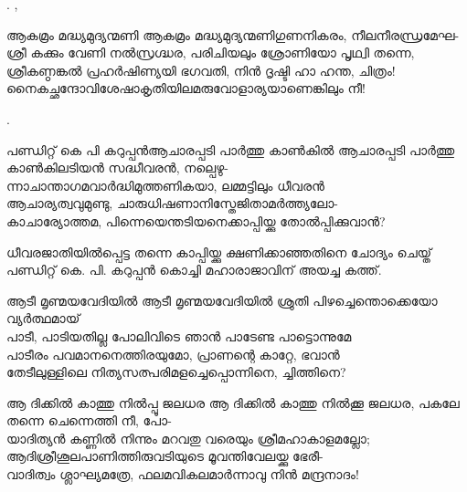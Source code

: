 \begin{enumerate}

.  ,


\begin{slokam}{\VSr}{\VNM}{ആകമ്രം മദ്ധ്യമുദ്യന്മണി}
ആകമ്രം മദ്ധ്യമുദ്യന്മണിഗുണനികരം, നീലനീരന്ധ്രമേഘ-\\
ശ്രീ കക്കും വേണി നൽസ്രഗ്ദ്ധര, പരിചിയലും ശ്രോണിയോ പൃഥ്വി തന്നെ,\\
ശ്രീകണ്ഠങ്കൽ പ്രഹർഷിണ്യയി ഭഗവതി, നിൻ ദൃഷ്ടി ഹാ ഹന്ത, ചിത്രം!\\
നൈകച്ഛന്ദോവിശേഷാകൃതിയിലമരുവോളാര്യയാണെങ്കിലും നീ!
\end{slokam}


.

\begin{slokam}{\VSv}{പണ്ഡിറ്റ് കെ പി കറുപ്പൻ}{ആചാരപ്പടി പാർത്തു കാൺകിൽ}
ആചാരപ്പടി പാർത്തു കാൺകിലടിയൻ സദ്ധീവരൻ, നല്പെഴു-\\
ന്നാചാന്താഗമവാർദ്ധിമുത്തണികയാ, ലമ്മട്ടിലും ധീവരൻ\\
ആചാര്യത്വവുമുണ്ടു, ചാരുധിഷണാനിസ്തേജിതാമർത്ത്യലോ-\\
കാചാര്യോത്തമ, പിന്നെയെന്തടിയനെക്കാപ്പിയ്ക്കു തോൽപ്പിക്കുവാൻ?
\end{slokam}


ധീവരജാതിയിൽപ്പെട്ട തന്നെ കാപ്പിയ്ക്കു ക്ഷണിക്കാഞ്ഞതിനെ ചോദ്യം ചെയ്ത് പണ്ഡിറ്റ്
കെ. പി. കറുപ്പൻ കൊച്ചി മഹാരാജാവിന് അയച്ച കത്ത്. 


\begin{slokam}{\VSv}{\YK}{ആടീ മൃണ്മയവേദിയിൽ}
ആടീ മൃണ്മയവേദിയിൽ ശ്രുതി പിഴച്ചെന്തൊക്കെയോ വ്യർത്ഥമായ് \\
പാടീ, പാടിയതില്ല പോലിവിടെ ഞാൻ പാടേണ്ട പാട്ടൊന്നുമേ\\
പാടീരം പവമാനനെത്തിരയുമോ, പ്രാണന്റെ കാറ്റേ, ഭവാൻ\\
തേടീലുള്ളിലെ നിത്യസത്പരിമളച്ചെപ്പൊന്നിനെ, ച്ചിത്തിനെ?
\end{slokam}


\begin{slokam}{\VSr}{\GSK}{ആ ദിക്കിൽ കാത്തു നിൽപ്പൂ ജലധര}
ആ ദിക്കിൽ കാത്തു നിൽക്കൂ ജലധര, പകലേ തന്നെ ചെന്നെത്തി നീ, പോ-\\
യാദിത്യൻ കണ്ണിൽ നിന്നും മറവതു വരെയും ശ്രീമഹാകാളമല്ലോ;\\
ആദിശ്രീശൂലപാണിത്തിരുവടിയുടെ മൂവന്തിവേലയ്ക്കു ഭേരീ-\\
വാദിത്വം ശ്ലാഘ്യമത്രേ, ഫലമവികലമാർന്നാവു നിൻ മന്ദ്രനാദം!
\end{slokam}


\end{enumerate}
